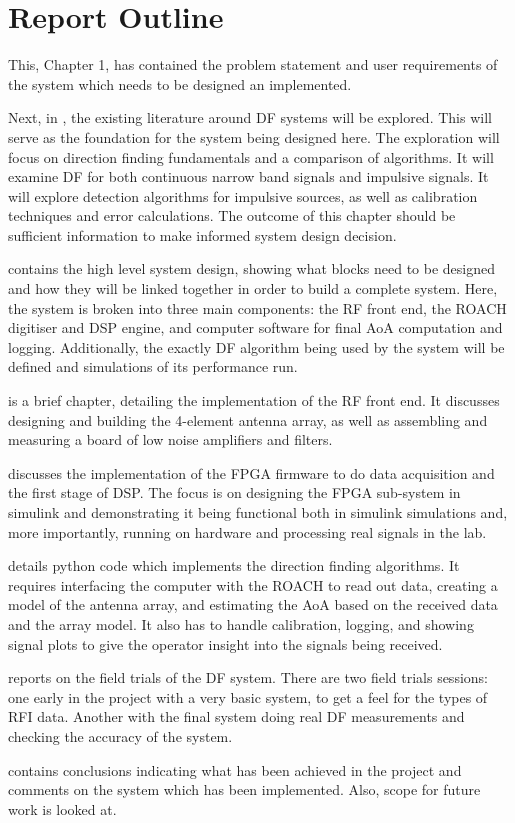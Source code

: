 \section{Report Outline}
This, Chapter 1, has contained the problem statement and user requirements of the system which needs to be designed an implemented. 

Next, in , the existing literature around DF systems will be explored. This will serve as the foundation for the system being designed here. The exploration will focus on direction finding fundamentals and a comparison of algorithms. It will examine DF for both continuous narrow band signals and impulsive signals. It will explore detection algorithms for impulsive sources, as well as calibration techniques and error calculations. The outcome of this chapter should be sufficient information to make informed system design decision.

 contains the high level system design, showing what blocks need to be designed and how they will be linked together in order to build a complete system. Here, the system is broken into three main components: the RF front end, the ROACH digitiser and DSP engine, and computer software for final AoA computation and logging. Additionally, the exactly DF algorithm being used by the system will be defined and simulations of its performance run.

 is a brief chapter, detailing the implementation of the RF front end. It discusses designing and building the 4-element antenna array, as well as assembling and measuring a board of low noise amplifiers and filters.

 discusses the implementation of the FPGA firmware to do data acquisition and the first stage of DSP. The focus is on designing the FPGA sub-system in simulink and demonstrating it being functional both in simulink simulations and, more importantly, running on hardware and processing real signals in the lab.

 details python code which implements the direction finding algorithms. It requires interfacing the computer with the ROACH to read out data, creating a model of the antenna array, and estimating the AoA based on the received data and the array model. It also has to handle calibration, logging, and showing signal plots to give the operator insight into the signals being received.

 reports on the field trials of the DF system. There are two field trials sessions: one early in the project with a very basic system, to get a feel for the types of RFI data. Another with the final system doing real DF measurements and checking the accuracy of the system.

 contains conclusions indicating what has been achieved in the project and comments on the system which has been implemented. Also, scope for future work is looked at.
